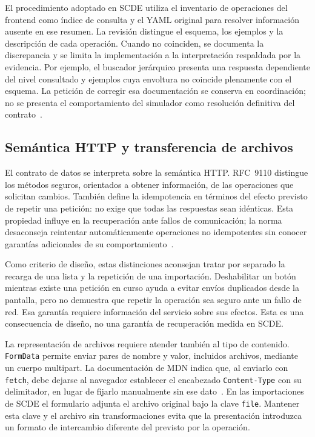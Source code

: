 El procedimiento adoptado en SCDE utiliza el inventario de operaciones del
frontend como índice de consulta y el YAML original para resolver información
ausente en ese resumen. La revisión distingue el esquema, los ejemplos y la
descripción de cada operación. Cuando no coinciden, se documenta la discrepancia
y se limita la implementación a la interpretación respaldada por la evidencia.
Por ejemplo, el buscador jerárquico presenta una respuesta dependiente del nivel
consultado y ejemplos cuya envoltura no coincide plenamente con el esquema.
La petición de corregir esa documentación se conserva en coordinación; no se
presenta el comportamiento del simulador como resolución definitiva del
contrato~\cite{scde_admin_implementation_2026}.

\subsection{Semántica HTTP y transferencia de archivos}

El contrato de datos se interpreta sobre la semántica HTTP. RFC~9110 distingue
los métodos seguros, orientados a obtener información, de las operaciones que
solicitan cambios. También define la idempotencia en términos del efecto
previsto de repetir una petición: no exige que todas las respuestas sean
idénticas. Esta propiedad influye en la recuperación ante fallos de comunicación;
la norma desaconseja reintentar automáticamente operaciones no idempotentes sin
conocer garantías adicionales de su comportamiento~\cite{codex_rfc9110}.

Como criterio de diseño, estas distinciones aconsejan tratar por separado la
recarga de una lista y la repetición de una importación. Deshabilitar un botón
mientras existe una petición en curso ayuda a evitar envíos duplicados desde la
pantalla, pero no demuestra que repetir la operación sea seguro ante un fallo
de red. Esa garantía requiere información del servicio sobre sus efectos. Esta
es una consecuencia de diseño, no una garantía de recuperación medida en SCDE.

La representación de archivos requiere atender también al tipo de contenido.
\texttt{FormData} permite enviar pares de nombre y valor, incluidos archivos,
mediante un cuerpo multipart. La documentación de MDN indica que, al enviarlo
con \texttt{fetch}, debe dejarse al navegador establecer el encabezado
\texttt{Content-Type} con su delimitador, en lugar de fijarlo manualmente sin
ese dato~\cite{codex_formdata_mdn}. En las importaciones de SCDE el formulario
adjunta el archivo original bajo la clave \texttt{file}. Mantener esta clave y
el archivo sin transformaciones evita que la presentación introduzca un
formato de intercambio diferente del previsto por la operación.

